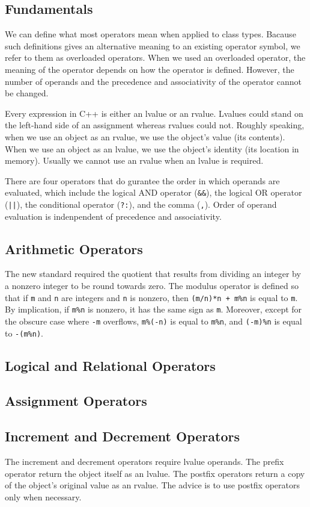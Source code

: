 \documentclass[11pt]{ctexart}
\begin{document}
\subsection{Fundamentals}
We can define what most operators mean when applied to class types. Bacause such definitions gives an alternative meaning to an existing operator symbol, we refer to them as overloaded operators. When we used an overloaded operator, the meaning of the operator depends on how the operator is defined. However, the number of operands and the precedence and associativity of the operator cannot be changed.\par Every expression in C++ is either an lvalue or an rvalue. Lvalues could stand on the left-hand side of an assignment whereas rvalues could not. Roughly speaking, when we use an object as an rvalue, we use the object's value (its contents). When we use an object as an lvalue, we use the object's identity (its location in memory). Usually we cannot use an rvalue when an lvalue is required.\par There are four operators that do gurantee the order in which operands are evaluated, which include the logical AND operator (\verb|&&|), the logical OR operator (\verb;||;), the conditional operator (\verb|?:|), and the comma (\verb|,|). Order of operand evaluation is indenpendent of precedence and associativity.
\subsection{Arithmetic Operators}
The new standard required the quotient that results from dividing an integer by a nonzero integer to be round towards zero. The modulus operator is defined so that if \verb|m| and \verb|n| are integers and \verb|n| is nonzero, then \verb|(m/n)*n + m%n| is equal to \verb|m|. By implication, if \verb|m%n| is nonzero, it has the same sign as \verb|m|. Moreover, except for the obscure case where \verb|-m| overflows, \verb|m%(-n)| is equal to \verb|m%n|, and \verb|(-m)%n| is equal to \verb|-(m%n)|. 
\subsection{Logical and Relational Operators}
\subsection{Assignment Operators}
\subsection{Increment and Decrement Operators}
The increment and decrement operators require lvalue operands. The prefix operator return the object itself as an lvalue. The postfix operators return a copy of the object's original value as an rvalue. The advice is to use postfix operators only when necessary.
\end{document}
